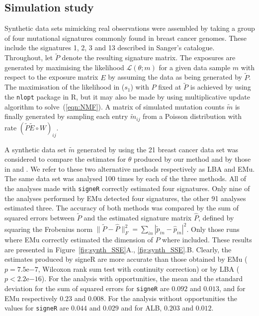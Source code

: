 \documentclass{bioinfo}
\begin{document}
\subsection{Simulation study}
Synthetic data sets mimicking real observations were assembled by
taking a group of four mutational signatures commonly found in breast
cancer genomes. These include the signatures 1, 2, 3 and 13 described
in Sanger's catalogue. Throughout, let $\widetilde P$ denote the
resulting signature matrix.  The exposures are generated by maximising
the likelihood $\mathcal L(\theta; m)$ for a given data sample $m$
with respect to the exposure matrix $E$ by assuming the data as being
generated by $\widetilde P$. The maximisation of the likelihood in
($s_1$) with $P$ fixed at $\widetilde P$ is achieved by using the
\texttt{nlopt} package in R, but it may also be made by using
\cite{LS} multiplicative update algorithm to solve~(\ref{eqn:NMF}). A
matrix of simulated mutation counts $\widetilde m$ is finally
generated by sampling each entry $\widetilde m_{ij}$ from a Poisson
distribution with rate $(\widetilde P\widetilde E\circ W)_{ij}$.

A synthetic data set $\widetilde m$ generated by using the 21 breast
cancer data set was considered to compare the estimates for $\theta$
produced by our method and by those in \cite{A} and \cite{FICMV}. We
refer to these two alternative methods respectively as LBA and EMu.
The same data set was analysed 100 times by each of the three
methods. All of the analyses made with \texttt{signeR} correctly
estimated four signatures. Only nine of the analyses performed by EMu
detected four signatures, the other 91 analyses estimated three.  The
accuracy of both methods was compared by the sum of squared errors
between $\widetilde P$ and the estimated signature matrix $\widehat
P$, defined by squaring the Frobenius norm $\|\widetilde P - \widehat
P\|_F^2 = \sum_{in} |\widetilde p_{in} - \widehat
p_{in}|^2$. Only those runs where EMu correctly estimated the
dimension of $P$ where included. These results are presented in
Figure~\ref{fig:synth_SSE}A., \ref{fig:synth_SSE}.B. Clearly, the
estimates produced by signeR are more accurate than those obtained by
EMu ($p = 7.5$e$-7$, Wilcoxon rank sum test with continuity
correction) or by LBA ($p < 2.2$e$-16$). For the analysis with
opportunities, the mean and the standard deviation for the sum of
squared errors for \texttt{signeR} are $0.092$ and $0.013$, and for
EMu respectively $0.23$ and $0.008$. For the analysis without
opportunities the values for \texttt{signeR} are $0.044$ and $0.029$
and for ALB, $0.203$ and $0.012$.
\end{document}
